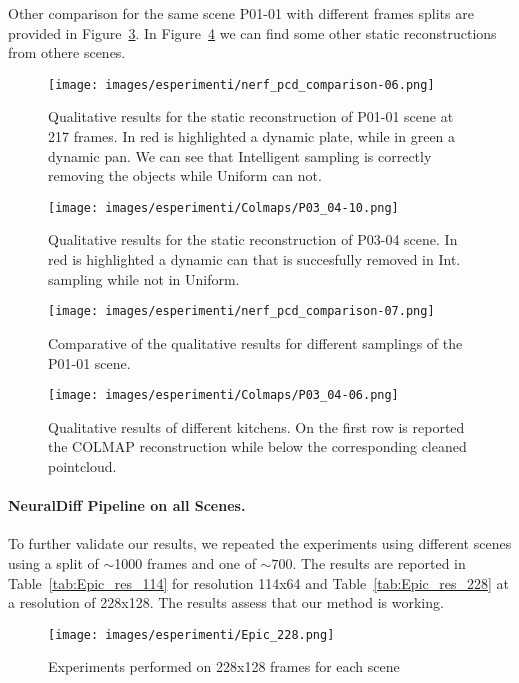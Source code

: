 Other comparison for the same scene P01-01 with different frames splits are provided in Figure~\ref{fig:statP01_02}. In Figure~\ref{fig:reco} we can 
find some other static reconstructions from othere scenes.
\begin{figure}[t]
    \centering
    \texttt{[image: images/esperimenti/nerf\_pcd\_comparison-06.png]} 
    \caption{Qualitative results for the static reconstruction of P01-01 scene at 217 frames. In red is highlighted
            a dynamic plate, while in green a dynamic pan. We can see that Intelligent sampling is correctly
            removing the objects while Uniform can not.}\label{fig:statP01_01}
\end{figure}
\begin{figure}[t]
    \centering
    \texttt{[image: images/esperimenti/Colmaps/P03\_04-10.png]} 
    \caption{Qualitative results for the static reconstruction of P03-04 scene. In red is highlighted
            a dynamic can that is succesfully removed in Int. sampling while not in Uniform.}\label{fig:fig:col_p03}
\end{figure}
\begin{figure}[t]
    
     {\texttt{[image: images/esperimenti/nerf\_pcd\_comparison-07.png]} }
    \caption{Comparative of the qualitative results for different samplings of the P01-01 scene.}\label{fig:statP01_02}
\end{figure}

\begin{figure}[t]
    
     {\texttt{[image: images/esperimenti/Colmaps/P03\_04-06.png]} }
    \caption{Qualitative results of different kitchens. On the first row is reported the COLMAP reconstruction
    while below the corresponding cleaned pointcloud.}\label{fig:reco}
\end{figure}


\paragraph{NeuralDiff Pipeline on all Scenes. }
To further validate our results, we repeated the experiments using different scenes using a split of $\sim$1000 frames and one of $\sim700$.
 The results are reported in Table~\ref{tab:Epic_res_114} for resolution 114x64 and Table~\ref{tab:Epic_res_228} at 
 a resolution of 228x128. The results assess that our method is working.
 

\begin{figure}[t]
    \centering
    \texttt{[image: images/esperimenti/Epic\_228.png]} 
    \caption{Experiments performed on 228x128 frames for each scene}\label{fig:Epic228}
\end{figure}

